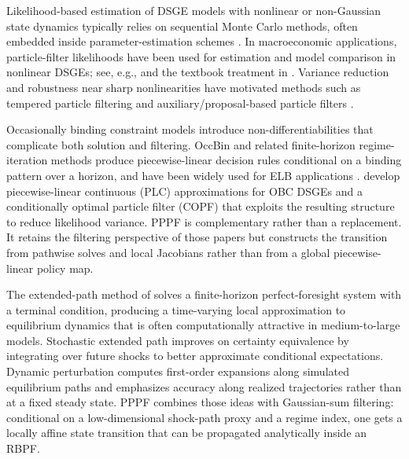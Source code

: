 \documentclass[11pt]{article}
\theoremstyle{remark}
\begin{document}
Likelihood-based estimation of DSGE models with nonlinear or non-Gaussian state dynamics typically relies on sequential Monte Carlo methods, often embedded inside parameter-estimation schemes \citep{KantasDoucetSinghMaciejowski2015,AndrieuDoucetHolenstein2010}.
In macroeconomic applications, particle-filter likelihoods have been used for estimation and model comparison in nonlinear DSGEs; see, e.g., \citet{FernandezVillaverdeRubioRamirez2007} and the textbook treatment in \citet{HerbstSchorfheide2016}.
Variance reduction and robustness near sharp nonlinearities have motivated methods such as tempered particle filtering \citep{HerbstSchorfheide2019} and auxiliary/proposal-based particle filters \citep{PittShephard1999}.

Occasionally binding constraint models introduce non-differentiabilities that complicate both solution and filtering.
OccBin \citep{GuerrieriIacoviello2015} and related finite-horizon regime-iteration methods produce piecewise-linear decision rules conditional on a binding pattern over a horizon, and have been widely used for ELB applications \citep{GustHerbstLopezSalidoSmith2017}.
\citet{AruobaCubaBordaHigaFloresSchorfheideVillalvazo2021} develop piecewise-linear continuous (PLC) approximations for OBC DSGEs and a conditionally optimal particle filter (COPF) that exploits the resulting structure to reduce likelihood variance.
PPPF is complementary rather than a replacement.
It retains the filtering perspective of those papers but constructs the transition from pathwise solves and local Jacobians rather than from a global piecewise-linear policy map.

The extended-path method of \citet{FairTaylor1983} solves a finite-horizon perfect-foresight system with a terminal condition, producing a time-varying local approximation to equilibrium dynamics that is often computationally attractive in medium-to-large models.
Stochastic extended path \citep{AdjemianJuillard2025} improves on certainty equivalence by integrating over future shocks to better approximate conditional expectations.
Dynamic perturbation \citep{MennuniRubioRamirezStepanchuk2025} computes first-order expansions along simulated equilibrium paths and emphasizes accuracy along realized trajectories rather than at a fixed steady state.
PPPF combines those ideas with Gaussian-sum filtering: conditional on a low-dimensional shock-path proxy and a regime index, one gets a locally affine state transition that can be propagated analytically inside an RBPF.
\end{document}
